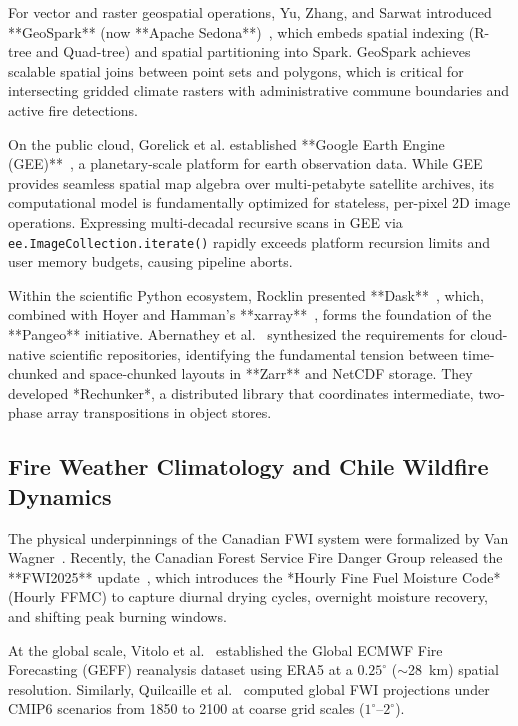 \documentclass[10pt,conference]{IEEEtran}
\begin{document}
For vector and raster geospatial operations, Yu, Zhang, and Sarwat introduced **GeoSpark** (now **Apache Sedona**)~\cite{yu2018spatial}, which embeds spatial indexing (R-tree and Quad-tree) and spatial partitioning into Spark. GeoSpark achieves scalable spatial joins between point sets and polygons, which is critical for intersecting gridded climate rasters with administrative commune boundaries and active fire detections. 

On the public cloud, Gorelick et al. established **Google Earth Engine (GEE)**~\cite{gorelick2017google}, a planetary-scale platform for earth observation data. While GEE provides seamless spatial map algebra over multi-petabyte satellite archives, its computational model is fundamentally optimized for stateless, per-pixel 2D image operations. Expressing multi-decadal recursive scans in GEE via \texttt{ee.ImageCollection.iterate()} rapidly exceeds platform recursion limits and user memory budgets, causing pipeline aborts.

Within the scientific Python ecosystem, Rocklin presented **Dask**~\cite{rocklin2015dask}, which, combined with Hoyer and Hamman's **xarray**~\cite{hoyer2017xarray}, forms the foundation of the **Pangeo** initiative. Abernathey et al.~\cite{abernathey2021cloud} synthesized the requirements for cloud-native scientific repositories, identifying the fundamental tension between time-chunked and space-chunked layouts in **Zarr** and NetCDF storage. They developed *Rechunker*, a distributed library that coordinates intermediate, two-phase array transpositions in object stores.

\subsection{Fire Weather Climatology and Chile Wildfire Dynamics}
The physical underpinnings of the Canadian FWI system were formalized by Van Wagner~\cite{vanwagner1987development}. Recently, the Canadian Forest Service Fire Danger Group released the **FWI2025** update~\cite{cfs2025fwi}, which introduces the *Hourly Fine Fuel Moisture Code* (Hourly FFMC) to capture diurnal drying cycles, overnight moisture recovery, and shifting peak burning windows. 

At the global scale, Vitolo et al.~\cite{vitolo2020era5} established the Global ECMWF Fire Forecasting (GEFF) reanalysis dataset using ERA5 at a $0.25^\circ$ ($\sim$28~km) spatial resolution. Similarly, Quilcaille et al.~\cite{quilcaille2023fire} computed global FWI projections under CMIP6 scenarios from 1850 to 2100 at coarse grid scales ($1^\circ$--$2^\circ$). 
\end{document}

